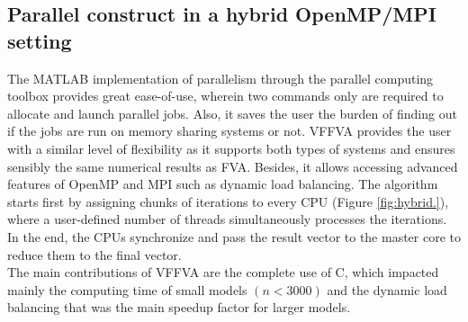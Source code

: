 \subsection*{Parallel construct in a hybrid OpenMP/MPI setting} 
The MATLAB implementation of parallelism through the parallel computing toolbox provides great ease-of-use, wherein two commands only are required to allocate and launch parallel jobs. Also, it saves the user the burden of finding out if the jobs are run on memory sharing systems or not. VFFVA provides the user with a similar level of flexibility as it supports both types of systems and ensures sensibly the same numerical results as FVA. Besides, it allows accessing advanced features of OpenMP and MPI such as dynamic load balancing. The algorithm starts first by assigning chunks of iterations to every CPU (Figure \ref{fig:hybrid.}), where a user-defined number of threads simultaneously processes the iterations. In the end, the CPUs synchronize and pass the result vector to the master core to reduce them to the final vector. \\
The main contributions of VFFVA are the complete use of C, which impacted mainly the computing time of small models $(n<3000)$ and the dynamic load balancing that was the main speedup factor for larger models.
